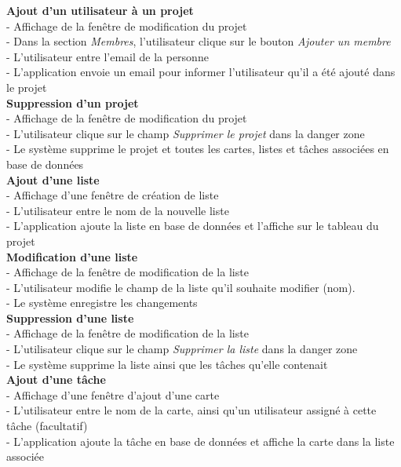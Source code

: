 \documentclass[conference]{IEEEtran}
\begin{document}
\textbf{Ajout d'un utilisateur à un projet}\\
- Affichage de la fenêtre de modification du projet\\
- Dans la section \textit{Membres}, l'utilisateur clique sur le bouton \textit{Ajouter un membre}\\
- L'utilisateur entre l'email de la personne\\
- L'application envoie un email pour informer l'utilisateur qu'il a été ajouté dans le projet\\

\textbf{Suppression d'un projet}\\
- Affichage de la fenêtre de modification du projet\\
- L'utilisateur clique sur le champ \textit{Supprimer le projet} dans la danger zone\\
- Le système supprime le projet et toutes les cartes, listes et tâches associées en base de données\\

\textbf{Ajout d'une liste}\\
- Affichage d'une fenêtre de création de liste\\
- L'utilisateur entre le nom de la nouvelle liste\\
- L'application ajoute la liste en base de données et l'affiche sur le tableau du projet\\

\textbf{Modification d'une liste}\\
- Affichage de la fenêtre de modification de la liste\\
- L'utilisateur modifie le champ de la liste qu'il souhaite modifier (nom).\\
- Le système enregistre les changements\\

\textbf{Suppression d'une liste}\\
- Affichage de la fenêtre de modification de la liste\\
- L'utilisateur clique sur le champ \textit{Supprimer la liste} dans la danger zone\\
- Le système supprime la liste ainsi que les tâches qu'elle contenait\\

\textbf{Ajout d'une tâche}\\
- Affichage d'une fenêtre d'ajout d'une carte\\
- L'utilisateur entre le nom de la carte, ainsi qu'un utilisateur assigné à cette tâche (facultatif)\\
- L'application ajoute la tâche en base de données et affiche la carte dans la liste associée\\
\end{document}
